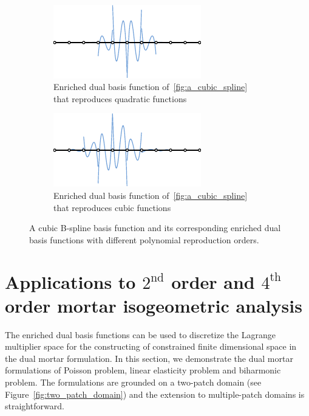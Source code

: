 \begin{figure}[ht]
\begin{subfigure}[t]{.45\linewidth}
	\end{subfigure}\\
	\begin{subfigure}[t]{.45\linewidth}
		\center
		\includegraphics[width=.9\columnwidth]{p=3_c=2}
		\caption{Enriched \Bezier dual basis function of~\ref{fig:a_cubic_spline} that reproduces quadratic functions}
	\end{subfigure}\hfil
	\begin{subfigure}[t]{.45\linewidth}
		\center
		\includegraphics[width=.9\columnwidth]{p=3_c=3}
		\caption{Enriched \Bezier dual basis function of~\ref{fig:a_cubic_spline} that reproduces cubic functions}
	\end{subfigure}
	\caption{A cubic B-spline basis function and its corresponding enriched \Bezier dual basis functions with different polynomial reproduction orders. }\label{fig:enriched_basis_functions}
\end{figure}

\FloatBarrier

\section{Applications to $2^\text{nd}$ order and $4^\text{th}$ order mortar isogeometric analysis}\label{sec:dual_mortar}

The enriched dual basis functions can be used to discretize the Lagrange multiplier space for the constructing of constrained finite dimensional space in the dual mortar formulation. In this section, we demonstrate the dual mortar formulations of Poisson problem, linear elasticity problem and biharmonic problem. The formulations are grounded on a two-patch domain (see Figure~\ref{fig:two_patch_domain}) and the extension to multiple-patch domains is straightforward.

